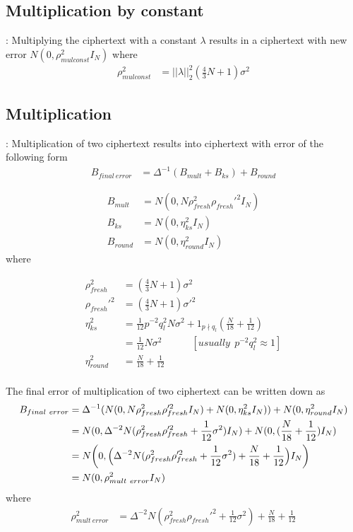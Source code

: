 \documentclass[a4paper,10pt]{article}
\begin{document}
\subsection{Multiplication by constant}: Multiplying the ciphertext with a constant $\lambda$ 
results in a ciphertext with new error $N(0,\rho_{mul const}^2I_N)$ where
\begin{align}
    \rho_{mul const}^2 &= ||\lambda||^2_2(\frac{4}{3}N+1)\sigma^2
\end{align}

\subsection{Multiplication}: Multiplication of two ciphertext results into ciphertext with error of the 
following form
\begin{align}
    B_{final\ error} &= \Delta^{-1}(B_{mult}+B_{ks})+B_{round}
\end{align}

\begin{align*}
B_{mult} &= N(0,N\rho_{fresh}^2\rho_{fresh}'^2I_N) \\
  B_{ks} &= N(0,\eta_{ks}^2I_N) \\
  B_{round} &= N(0,\eta_{round}^2 I_N)
\end{align*}
where

\begin{align*}
\rho_{fresh}^2 &=(\frac{4}{3}N+1)\sigma^2 \\
\rho_{fresh}'^2 &=(\frac{4}{3}N+1)\sigma'^2 \\
\eta_{ks}^2     &=\frac{1}{12}p^{-2}q^2_{l}N\sigma^2+1_{p \nmid q_l}(\frac{N}{18}+\frac{1}{12}) \\
                &=\frac{1}{12} N\sigma^2 \hspace{3em}[usually\ \ p^{-2}q^2_{l}\approx 1]\\
\eta^2_{round}  &= \frac{N}{18} + \frac{1}{12}\\
\end{align*}

The final error of multiplication of two ciphertext can be written down as
\begin{align}
    B_{final\ error} &= \Delta^{-1}(N(0,N\rho_{fresh}^2\rho_{fresh}'^2I_N)+ N(0,\eta_{ks}^2I_N))+N(0,\eta_{round}^2 I_N) \nonumber \\
                     &= N(0,\Delta^{-2}N(\rho_{fresh}^2\rho_{fresh}'^2+\frac{1}{12}\sigma^2)I_N) + N(0,(\frac{N}{18}+\frac{1}{12})I_N) \nonumber \\
                     &= N \biggl(0,\Bigl(\Delta^{-2}N(\rho_{fresh}^2\rho_{fresh}'^2+\frac{1}{12}\sigma^2)+\frac{N}{18}+\frac{1}{12}\Bigr)I_N\biggl) \nonumber \\
                     &=N(0,\rho_{mult\ error}^2I_N)
\end{align}
where
\begin{align*}
\rho_{mult\ error}^2 &= \Delta^{-2}N(\rho_{fresh}^2\rho_{fresh}'^2+\frac{1}{12}\sigma^2)+\frac{N}{18}+\frac{1}{12}  \\
\end{align*}
\end{document}
